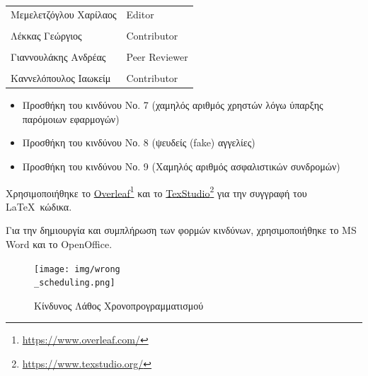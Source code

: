 \documentclass{../ol-softwaremanual}
\newcommand{\doclink}[2]{\href{#1}{#2}\footnote{\url{#1}}}
\begin{document}
	
	\vspace{20pt}
	
	\begin{table}[htbp!]
		\begin{tabular}{ll}
			Μεμελετζόγλου Χαρίλαος & \en Editor \\
			\\ Λέκκας Γεώργιος      &   \en  Contributor \\
			\\ Γιαννουλάκης Ανδρέας & \en Peer Reviewer \\
			\\ Καννελόπουλος Ιαωκείμ & \en Contributor \\ 
		\end{tabular}
	\end{table}

	\vspace{10pt}

	\begin{itemize}
		\item Προσθήκη του κινδύνου Νο. 7 (χαμηλός αριθμός χρηστών λόγω ύπαρξης παρόμοιων εφαρμογών)
		\item Προσθήκη του κινδύνου Νο. 8 (ψευδείς \en (fake) \gr αγγελίες)
		\item Προσθήκη του κινδύνου Νο. 9 (Χαμηλός αριθμός ασφαλιστικών συνδρομών)
	\end{itemize}

	
	
	\vspace{20pt}
	
	
	\vspace{20pt}
	\flushleft
	Χρησιμοποιήθηκε το \en \doclink{https://www.overleaf.com/}{Overleaf} \gr και το \en \doclink{https://www.texstudio.org/}{TexStudio} \gr για την συγγραφή του \LaTeX\ κώδικα. \break
	
	Για την δημιουργία και συμπλήρωση των φορμών κινδύνων, χρησιμοποιήθηκε το \en MS Word \gr και το \en OpenOffice\gr.
	
	
	
	
	\newpage 
	
	
	\flushleft
	
	\begin{figure}[htbp!]
		\texttt{[image: img/wrong\\\_scheduling.png]}
		\caption{Κίνδυνος Λάθος Χρονοπρογραμματισμού}
	\end{figure}
	
\end{document}
